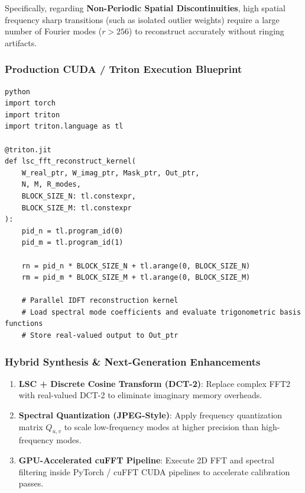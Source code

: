 Specifically, regarding \textbf{Non-Periodic Spatial Discontinuities}, high spatial frequency sharp transitions (such as isolated outlier weights) require a large number of Fourier modes ($r > 256$) to reconstruct accurately without ringing artifacts.



\subsubsection*{Production CUDA / Triton Execution Blueprint}

\vspace{0.5em}
\begin{mdframed}[backgroundcolor=codebg, linecolor=codeframe, linewidth=1pt, roundcorner=4pt, innerleftmargin=2pt, innerrightmargin=5pt, innertopmargin=5pt, innerbottommargin=5pt]
\begin{lstlisting}
python
import torch
import triton
import triton.language as tl

@triton.jit
def lsc_fft_reconstruct_kernel(
    W_real_ptr, W_imag_ptr, Mask_ptr, Out_ptr,
    N, M, R_modes,
    BLOCK_SIZE_N: tl.constexpr,
    BLOCK_SIZE_M: tl.constexpr
):
    pid_n = tl.program_id(0)
    pid_m = tl.program_id(1)

    rn = pid_n * BLOCK_SIZE_N + tl.arange(0, BLOCK_SIZE_N)
    rm = pid_m * BLOCK_SIZE_M + tl.arange(0, BLOCK_SIZE_M)

    # Parallel IDFT reconstruction kernel
    # Load spectral mode coefficients and evaluate trigonometric basis functions
    # Store real-valued output to Out_ptr
\end{lstlisting}
\end{mdframed}
\vspace{0.5em}


\subsubsection*{Hybrid Synthesis \& Next-Generation Enhancements}

\begin{enumerate}
\item \textbf{LSC + Discrete Cosine Transform (DCT-2)}: Replace complex FFT2 with real-valued DCT-2 to eliminate imaginary memory overheads.
\item \textbf{Spectral Quantization (JPEG-Style)}: Apply frequency quantization matrix $Q_{u, v}$ to scale low-frequency modes at higher precision than high-frequency modes.
\item \textbf{GPU-Accelerated cuFFT Pipeline}: Execute 2D FFT and spectral filtering inside PyTorch / cuFFT CUDA pipelines to accelerate calibration passes.

\end{enumerate}

